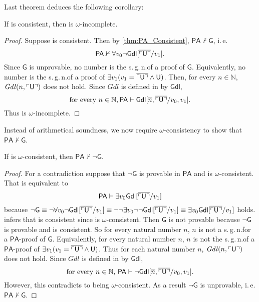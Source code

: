 Last theorem deduces the following corollary:
\begin{cor} \label{cor:PAconsistent}
If \PA is consistent, then \PA is $\omega$-incomplete.
\end{cor}

\begin{proof}
Suppose \PA is consistent. Then by \cref{thm:PA_Consistent}, $\mathsf{PA} \nvdash \mathsf{G}$, i.\,e.\@ \[\mathsf{PA} \nvdash  \forall v_0  \lnot \mathsf{Gdl}[\overline{\ulcorner \mathsf{U} \urcorner }/v_1 ].\] Since $\mathsf{G}$ is unprovable, no number is the s.\,g.\,n.\@ of  a proof of $\mathsf{G}$. Equivalently, no number is the s.\,g.\,n.\@ of a proof of  $\exists v_1 (v_1 = \overline{\ulcorner \mathsf{U} \urcorner} \wedge\mathsf{ U})$. Then, for every $n \in \mathbb{N}$, $\mathit{Gdl}(n, \ulcorner \mathsf{U} \urcorner )$ does not hold. Since $\mathit{Gdl}$ is defined in \PA by $\mathsf{Gdl}$, 
\[ \text{for every }n \in \mathbb{N}, \mathsf{PA} \vdash \mathsf{Gdl} [\overline{n}, \overline{\ulcorner \mathsf{U} \urcorner}/v_0, v_1]. \] Thus \PA is $\omega$-incomplete.
\end{proof}

Instead of arithmetical soundness, we now require $\omega$-consistency to show that $\mathsf{PA} \nvdash \mathsf{G}$.
\begin{thm}\label{thm:PAdoesnotprovenotG}
If \PA is $\omega$-consistent, then $\mathsf{PA} \nvdash \lnot \mathsf{G}$.
\end{thm}

\begin{proof}
For a contradiction suppose that $\mathsf{\lnot G}$ is provable in $\mathsf{PA}$ and \PA is $\omega$-consistent. That is equivalent to 
\[ \mathsf{PA} \vdash \exists v_0 \mathsf{Gdl}[\overline{\ulcorner \mathsf{U} \urcorner }/v_1 ]   \] because $\lnot \mathsf{G} \equiv \lnot \forall v_0  \lnot \mathsf{Gdl}[\overline{\ulcorner \mathsf{U} \urcorner }/v_1 ] \equiv \lnot \lnot \exists v_0 \lnot  \lnot  \mathsf{Gdl}[\overline{\ulcorner \mathsf{U} \urcorner }/v_1 ] \equiv \exists v_0 \mathsf{Gdl}[\overline{\ulcorner \mathsf{U} \urcorner }/v_1 ]  $ holds.  infers that \PA is consistent since \PA is $\omega$-consistent. Then $\mathsf{G}$ is not provable because $\mathsf{\lnot G}$ is provable and \PA is consistent. So for every natural number $n$, $n$ is not a s.\,g.\,n.\@ for a $\mathsf{PA}$-proof of $\mathsf{G}$. Equivalently, for every natural number $n$, $n$ is not the s.\,g.\,n.\@ of a $\mathsf{PA}$-proof of $\exists v_1 (v_1 = \overline{\ulcorner \mathsf{U} \urcorner} \wedge\mathsf{ U})$. Thus 
for each natural number $n$, $\mathit{Gdl}(n, \ulcorner \mathsf{U}\urcorner)$ does not hold. Since $\mathit{Gdl}$ is defined in \PA by $\mathsf{Gdl}$,
\[\text{for every }n\in \mathbb{N}\text{, }\mathsf{PA} \vdash \lnot \mathsf{Gdl}[\overline{n}, \overline{\ulcorner \mathsf{U}\urcorner}/v_0,v_1].
\]
However, this contradicts to \PA being $\omega$-consistent. As a result $\lnot \mathsf{G}$ is unprovable, i.\,e.\@ $\mathsf{PA \nvdash G}$.
\end{proof}

